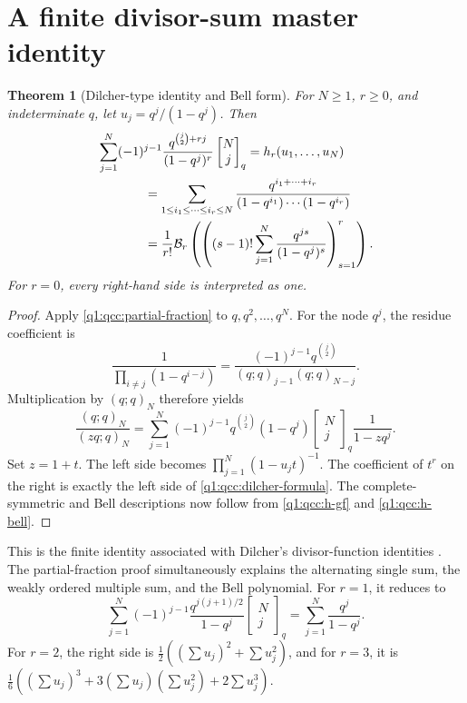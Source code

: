 \documentclass[11pt,a4paper,oneside,openany]{book}
\newtheorem{theorem}{Theorem}[chapter]
\theoremstyle{definition}
\theoremstyle{remark}
\newcommand{\GB}[3][q]{\begin{bmatrix}#2\\#3\end{bmatrix}_{#1}}
\newcommand{\Y}[1]{\mathcal B_{#1}}
\begin{document}
\section{A finite divisor-sum master identity}
\begin{theorem}[Dilcher-type identity and Bell form]\label{q1:qcc:dilcher}
For \(N\ge1\), \(r\ge0\), and indeterminate \(q\), let
\(u_j=q^j/(1-q^j)\). Then
\begin{align}
 &\sum_{j=1}^N(-1)^{j-1}
  \frac{q^{\binom j2+rj}}{(1-q^j)^r}\GB Nj
 =h_r(u_1,\ldots,u_N)\label{q1:qcc:dilcher-formula}\\
 &\hspace{13mm}
 =\sum_{1\le i_1\le\cdots\le i_r\le N}
      \frac{q^{i_1+\cdots+i_r}}{(1-q^{i_1})\cdots(1-q^{i_r})}
 \nonumber\\
 &\hspace{13mm}
 =\frac1{r!}\Y r\left(
       \left((s-1)!\sum_{j=1}^N\frac{q^{js}}{(1-q^j)^s}\right)_{s=1}^r
       \right).
 \label{q1:qcc:dilcher-bell}
\end{align}
For \(r=0\), every right-hand side is interpreted as one.
\end{theorem}
\begin{proof}
Apply \cref{q1:qcc:partial-fraction} to \(q,q^2,\ldots,q^N\). For the node
\(q^j\), the residue coefficient is
\[
 \frac1{\prod_{i\ne j}(1-q^{i-j})}
 =\frac{(-1)^{j-1}q^{\binom j2}}{(q;q)_{j-1}(q;q)_{N-j}}.
\]
Multiplication by \((q;q)_N\) therefore yields
\begin{equation}\label{q1:qcc:divisor-rational}
 \frac{(q;q)_N}{(zq;q)_N}
 =\sum_{j=1}^N(-1)^{j-1}q^{\binom j2}(1-q^j)\GB Nj\frac1{1-zq^j}.
\end{equation}
Set \(z=1+t\). The left side becomes
\(\prod_{j=1}^N(1-u_jt)^{-1}\).
The coefficient of \(t^r\) on the right is exactly the left side of
\eqref{q1:qcc:dilcher-formula}. The complete-symmetric and Bell descriptions now
follow from \eqref{q1:qcc:h-gf} and \eqref{q1:qcc:h-bell}.
\end{proof}
This is the finite identity associated with Dilcher's divisor-function
identities \cite{dilcher}. The partial-fraction proof simultaneously explains the
alternating single sum, the weakly ordered multiple sum, and the Bell polynomial.
For \(r=1\), it reduces to
\[
 \sum_{j=1}^N(-1)^{j-1}\frac{q^{j(j+1)/2}}{1-q^j}\GB Nj
 =\sum_{j=1}^N\frac{q^j}{1-q^j}.
\]
For \(r=2\), the right side is \(\frac12((\sum u_j)^2+\sum u_j^2)\),
and for \(r=3\), it is
\(\frac16((\sum u_j)^3+3(\sum u_j)(\sum u_j^2)+2\sum u_j^3)\).
\end{document}
